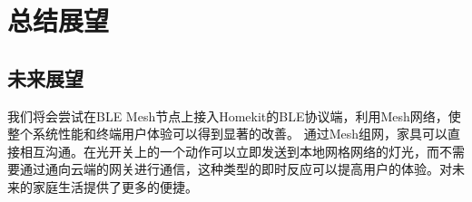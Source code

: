 \chapter{总结展望}

\section{未来展望}
我们将会尝试在BLE Mesh节点上接入Homekit的BLE协议端，利用Mesh网络，使整个系统性能和终端用户体验可以得到显著的改善。 通过Mesh组网，家具可以直接相互沟通。在光开关上的一个动作可以立即发送到本地网格网络的灯光，而不需要通过通向云端的网关进行通信，这种类型的即时反应可以提高用户的体验。对未来的家庭生活提供了更多的便捷。